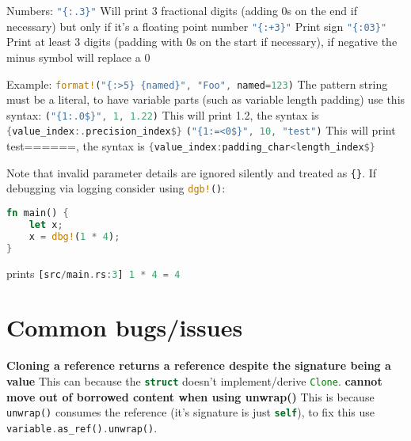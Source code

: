 \documentclass[a4paper,11pt]{article}
\begin{document}
Numbers:
\newline
\lstinline[language=Rust]|"{:.3}"| Will print 3 fractional digits (adding 0s on the end if necessary) but only if it's a floating point number
\newline
\lstinline[language=Rust]|"{:+3}"| Print sign 
\newline
\lstinline[language=Rust]|"{:03}"| Print at least 3 digits (padding with 0s on the start if necessary), if negative the minus symbol will replace a 0
\newline

Example:
\newline
\lstinline[language=Rust]|format!("{:>5} {named}", "Foo", named=123)|
\newline
The pattern string must be a literal, to have variable parts (such as variable length padding) use this syntax:
\newline
\lstinline[language=Rust]|("{1:.0$}", 1, 1.22)|
\newline
This will print 1.2, the syntax is \lstinline[language=Rust]|{value_index:.precision_index$}|
\newline
\lstinline[language=Rust]|("{1:=<0$}", 10, "test")| 
\newline
This will print test======, the syntax is \lstinline[language=Rust]|{value_index:padding_char<length_index$}|
\newline


Note that invalid parameter details are ignored silently and treated as \lstinline|{}|.
\newline
If debugging via logging consider using \lstinline[language=Rust]|dgb!()|:
\begin{lstlisting}[language=Rust,frame=single]
fn main() {
    let x;
    x = dbg!(1 * 4);
}
\end{lstlisting}
prints 
\newline
\lstinline[language=Rust]|[src/main.rs:3] 1 * 4 = 4|

\newpage
\section{Common bugs/issues}
\textbf{Cloning a reference returns a reference despite the signature being a value}
\newline
This can because the \lstinline[language=Rust]{struct} doesn't implement/derive \lstinline[language=Rust]{Clone}.
\medskip
\newline
\textbf{cannot move out of borrowed content when using unwrap()}
\newline
This is because \lstinline[language=Rust]{unwrap()} consumes the reference (it's signature is just \lstinline[language=Rust]{self}), to fix this use
\lstinline[language=Rust]{variable.as_ref().unwrap()}.
\end{document}
